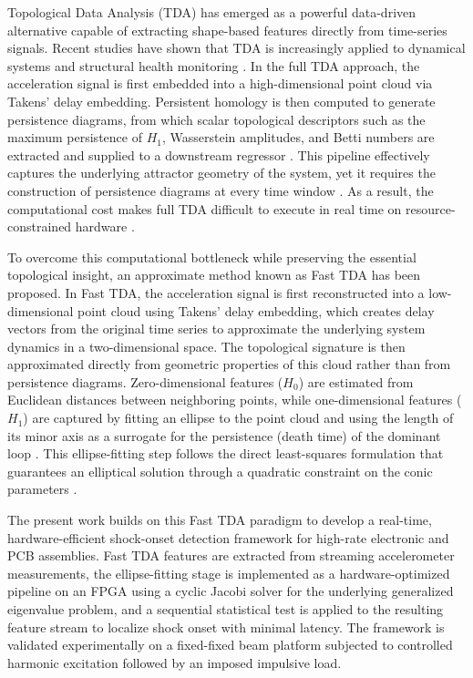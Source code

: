 \documentclass[colorlinks,upint,subscriptcorrection,varvw,hyphenate,balance,greek,russian,vietnamese,german]{asmeconf} %
\begin{document}
Topological Data Analysis (TDA) has emerged as a powerful data-driven alternative capable of extracting shape-based features directly from time-series signals. Recent studies have shown that TDA is increasingly applied to dynamical systems and structural health monitoring \cite{Tempelman2020lookchaosdetection,Gowdridge2022TopologicalDataAnalysis}. In the full TDA approach, the acceleration signal is first embedded into a high-dimensional point cloud via Takens' delay embedding. Persistent homology is then computed to generate persistence diagrams, from which scalar topological descriptors such as the maximum persistence of \(H_1\), Wasserstein amplitudes, and Betti numbers are extracted and supplied to a downstream regressor \cite{Chua2025Probabilisticmachinelearning}. This pipeline effectively captures the underlying attractor geometry of the system, yet it requires the construction of persistence diagrams at every time window \cite{Razmarashooli2025Realtimestate}. As a result, the computational cost makes full TDA difficult to execute in real time on resource-constrained hardware \cite{SalazarMartinez2025FastTopologicalData}.

To overcome this computational bottleneck while preserving the essential topological insight, an approximate method known as Fast TDA has been proposed. In Fast TDA, the acceleration signal is first reconstructed into a low-dimensional point cloud using Takens' delay embedding, which creates delay vectors from the original time series to approximate the underlying system dynamics in a two-dimensional space. The topological signature is then approximated directly from geometric properties of this cloud rather than from persistence diagrams. Zero-dimensional features (\(H_0\)) are estimated from Euclidean distances between neighboring points, while one-dimensional features (\(H_1\)) are captured by fitting an ellipse to the point cloud and using the length of its minor axis as a surrogate for the persistence (death time) of the dominant loop \cite{SalazarMartinez2025FastTopologicalData}. This ellipse-fitting step follows the direct least-squares formulation that guarantees an elliptical solution through a quadratic constraint on the conic parameters \cite{Fitzgibbon1999Directleastsquare}.

The present work builds on this Fast TDA paradigm to develop a real-time, hardware-efficient shock-onset detection framework for high-rate electronic and PCB assemblies. Fast TDA features are extracted from streaming accelerometer measurements, the ellipse-fitting stage is implemented as a hardware-optimized pipeline on an FPGA using a cyclic Jacobi solver for the underlying generalized eigenvalue problem, and a sequential statistical test is applied to the resulting feature stream to localize shock onset with minimal latency. The framework is validated experimentally on a fixed-fixed beam platform subjected to controlled harmonic excitation followed by an imposed impulsive load.
\end{document}
